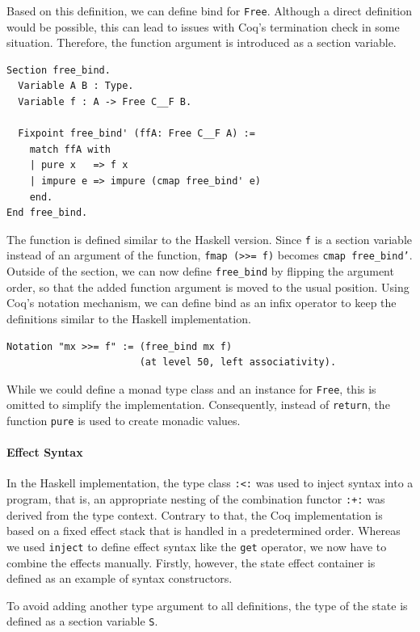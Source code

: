 \documentclass[a4paper, 11pt, fleqn, twoside]{scrreprt}
\newcommand{\hinl}[1]{\texttt{#1}}
\newcommand{\cinl}[1]{\texttt{#1}}
\begin{document}
Based on this definition, we can define bind for \cinl{Free}.
Although a direct definition would be possible, this can lead to issues with Coq's termination check in some situation.
Therefore, the function argument is introduced as a section variable.

\begin{verbatim}
Section free_bind.
  Variable A B : Type.
  Variable f : A -> Free C__F B.

  Fixpoint free_bind' (ffA: Free C__F A) :=
    match ffA with
    | pure x   => f x
    | impure e => impure (cmap free_bind' e)
    end.
End free_bind.
\end{verbatim}

The function is defined similar to the Haskell version.
Since \cinl{f} is a section variable instead of an argument of the function, \hinl{fmap (>>= f)} becomes \cinl{cmap free_bind'}.
Outside of the section, we can now define \cinl{free_bind} by flipping the argument order, so that the added function argument is moved to the usual position.
Using Coq's notation mechanism, we can define bind as an infix operator to keep the definitions similar to the Haskell implementation.

\begin{verbatim}
Notation "mx >>= f" := (free_bind mx f)
                       (at level 50, left associativity).
\end{verbatim}

While we could define a monad type class and an instance for \cinl{Free}, this is omitted to simplify the implementation.
Consequently, instead of \hinl{return}, the function \cinl{pure} is used to create monadic values.

\paragraph{Effect Syntax}

In the Haskell implementation, the type class \hinl{:<:} was used to inject syntax into a program, that is, an appropriate nesting of the combination functor \hinl{:+:} was derived from the type context.
Contrary to that, the Coq implementation is based on a fixed effect stack that is handled in a predetermined  order.
Whereas we used \hinl{inject} to define effect syntax like the \hinl{get} operator, we now have to combine the effects manually.
Firstly, however, the state effect container is defined as an example of syntax constructors.

To avoid adding another type argument to all definitions, the type of the state is defined as a section variable \cinl{S}.
\end{document}
